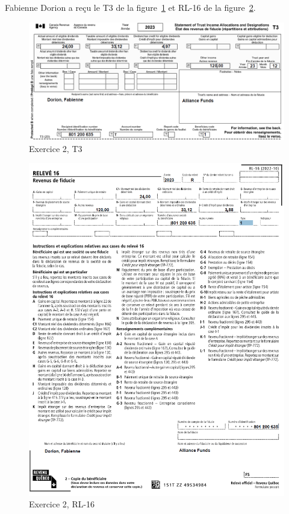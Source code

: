 \begin{question}
	Fabienne Dorion a reçu le T3 de la figure~\ref{fig:chap6Exercice2T3} et RL-16 de la figure~\ref{fig:chap6Exercice2RL16}.
	
	\begin{figure}
		\centering
		\includegraphics[width=.9\textwidth]{exercice/6-2/Q8/T3.png}
		\caption[]{Exercice 2, T3}
		\label{fig:chap6Exercice2T3}
	\end{figure}
	
	\begin{figure}
		\centering
		\includegraphics[width=.9\textwidth]{exercice/6-2/Q8/RL16.png}
		\caption[]{Exercice 2, RL-16}
		\label{fig:chap6Exercice2RL16}
	\end{figure}
\end{question}

